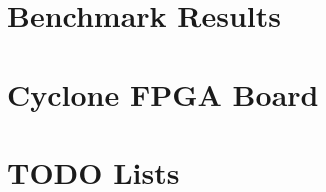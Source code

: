 \chapter{Benchmark Results} \label{appx:bench}


\chapter{Cyclone FPGA Board} \label{appx:cycore}




\chapter{TODO Lists}




